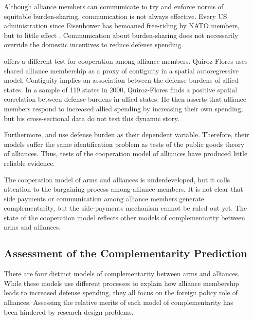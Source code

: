 \documentclass[12pt]{article}
\begin{document}
Although alliance members can communicate to try and enforce norms of equitable burden-sharing, communication is not always effective.  
Every US administration since Eisenhower has bemoaned free-riding by NATO members, but to little effect \citep{Lanoszka2015}. 
Communication about burden-sharing does not necessarily override the domestic incentives to reduce defense spending. 


\citet{QuirozFlores2011} offers a different test for cooperation among alliance members. 
Quiroz-Flores uses shared alliance membership as a proxy of contiguity in a spatial autoregressive model.
Contiguity implies an association between the defense burdens of allied states. 
In a sample of 119 states in 2000, Quiroz-Flores finds a positive spatial correlation between defense burdens in allied states. 
He then asserts that alliance members respond to increased allied spending by increasing their own spending, but his cross-sectional data do not test this dynamic story.


Furthermore, \citet{Palmer1990} and \citet{QuirozFlores2011} use defense burden as their dependent variable.
Therefore, their models suffer the same identification problem as tests of the public goods theory of alliances. 
Thus, tests of the cooperation model of alliances have produced little reliable evidence. 


The cooperation model of arms and alliances is underdeveloped, but it calls attention to the bargaining process among alliance members. 
It is not clear that side payments or communication among alliance members generate complementarity, but the side-payments mechanism cannot be ruled out yet. 
The state of the cooperation model reflects other models of complementarity between arms and alliances.  



\subsection{Assessment of the Complementarity Prediction} 


There are four distinct models of complementarity between arms and alliances.
While these models use different processes to explain how alliance membership leads to increased defense spending, they all focus on the foreign policy role of alliances. 
Assessing the relative merits of each model of complementarity has been hindered by research design problems. 
\end{document}
